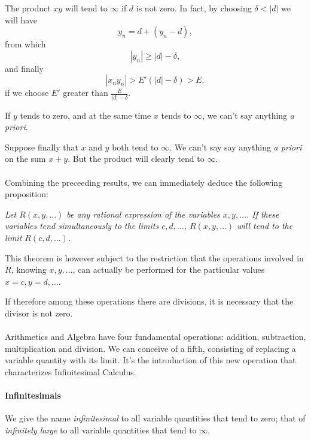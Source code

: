 \documentclass[10pt,letterpaper]{book}
\theoremstyle{definition}
\begin{document}

The product $xy$ will tend to $\infty$ if $d$ is not zero. In fact, by choosing $\delta < |d|$ we will have
\[
  y_n = d + (y_n - d),
\]
from which
\[
  |y_n|\geq |d| - \delta,
\]
and finally
\[
  |x_ny_n| > E'(|d|-\delta) > E,
\]
if we choose $E'$ greater than $\frac{E}{|d|-\delta}$.

If $y$ tends to zero, and at the same time $x$ tends to $\infty$, we can't say anything \textit{a priori}.

Suppose finally that $x$ and $y$ both tend to $\infty$. We can't say say anything \textit{a priori} on the sum $x+y$. But the product will clearly tend to $\infty$.

\paragraph{} Combining the preceeding results, we can immediately deduce the following proposition:

\textit{Let $R(x,y,\dots)$ be any rational expression of the variables $x, y, \dots$. If these variables tend simultaneously to the limits $c, d, \dots$, $R(x,y,\dots)$ will tend to the limit $R(c,d,\dots)$.}

This theorem is however subject to the restriction that the operations involved in $R$, knowing $x, y,\dots$, can actually be performed for the particular values $x=c, y=d, \dots$.

If therefore among these operations there are divisions, it is necessary that the divisor is not zero.

\paragraph{} Arithmetics and Algebra have four fundamental operations: addition, subtraction, multiplication and division. We can conceive of a fifth, consisting of replacing a variable quantity with its limit. It's the introduction of this new operation that characterizes Infinitesimal Calculus.


\paragraph{Infinitesimals} We give the name \textit{infinitesimal} to all variable quantities that tend to zero; that of \textit{infinitely large} to all variable quantities that tend to $\infty$.
\end{document}
